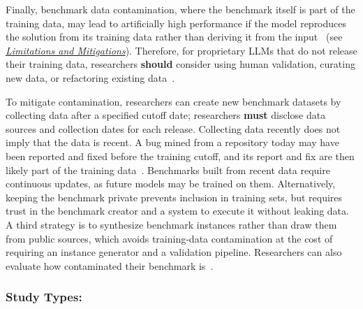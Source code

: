 \documentclass[smallextended]{svjour3}
\newcommand{\must}{\textbf{must}\xspace}
\newcommand{\should}{\textbf{should}\xspace}
\newcommand{\limitationsmitigations}{\hyperref[sec:report-limitations-and-mitigations]{\emph{Limitations and Mitigations}}\xspace}
\newcommand{\limitationsmitigations}{\href{/guidelines/limitations/}{\emph{Limitations and Mitigations}}\xspace}
\newcommand{\guidelinesubsubsection}[1]{\subsubsection{\bfseries #1:}}
\newcommand{\guidelinesubsubsection}[1]{\subsubsection{#1}}
\begin{document}
Finally, benchmark data contamination, where the benchmark itself is part of the training data, may lead to artificially high performance if the model reproduces the solution from its training data rather than deriving it from the input~\cite{DBLP:journals/corr/abs-2406-04244} (see \limitationsmitigations). Therefore, for proprietary LLMs that do not release their training data, researchers \should consider using human validation, curating new data, or refactoring existing data~\cite{DBLP:journals/corr/abs-2406-04244}. 

To mitigate contamination, researchers can create new benchmark datasets by collecting data after a specified cutoff date; researchers \must disclose data sources and collection dates for each release. Collecting data recently does not imply that the data is recent. A bug mined from a repository today may have been reported and fixed before the training cutoff, and its report and fix are then likely part of the training data~\cite{Izadi2026benchmarking}. Benchmarks built from recent data require continuous updates, as future models may be trained on them. Alternatively, keeping the benchmark private prevents inclusion in training sets, but requires trust in the benchmark creator and a system to execute it without leaking data. A third strategy is to synthesize benchmark instances rather than draw them from public sources, which avoids training-data contamination at the cost of requiring an instance generator and a validation pipeline. Researchers can also evaluate how contaminated their benchmark is~\cite{DBLP:journals/corr/abs-2502-00678}.


\guidelinesubsubsection{Study Types}
\end{document}
